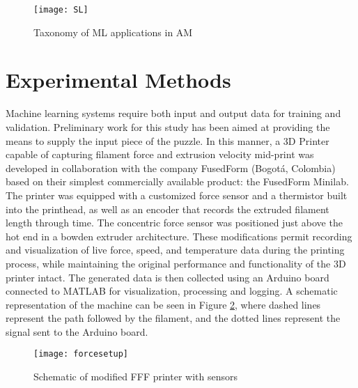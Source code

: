 \documentclass[main.tex]{subfiles}
\begin{document}
\begin{figure}[!htbp]
	\center
	\texttt{[image: SL]}
	\caption{Taxonomy of ML applications in AM \cite{Meng2020}} \label{fig:supL}
\end{figure}

\section{Experimental Methods} \label{sec:ml_meth}

Machine learning systems require both input and output data for training and validation. Preliminary work for this study has been aimed at providing the means to supply the input piece of the puzzle. In this manner, a 3D Printer capable of capturing filament force and extrusion velocity mid-print was developed in collaboration with the company FusedForm (Bogot\'{a}, Colombia) based on their simplest commercially available product: the FusedForm Minilab. The printer was equipped with a customized force sensor and a thermistor built into the printhead, as well as an encoder that records the extruded filament length through time. The concentric force sensor was positioned just above the hot end in a bowden extruder architecture. These modifications permit recording and visualization of live force, speed, and temperature data during the printing process, while maintaining the original performance and functionality of the 3D printer intact. The generated data is then collected using an Arduino board connected to MATLAB for visualization, processing and logging. A schematic representation of the machine can be seen in Figure \ref{fig:shakira}, where dashed lines represent the path followed by the filament, and the dotted lines represent the signal sent to the Arduino board.

\begin{figure}[!htbp]
	\center
	\texttt{[image: forcesetup]}
	\caption{Schematic of modified FFF printer with sensors} \label{fig:shakira}
\end{figure}
\end{document}
